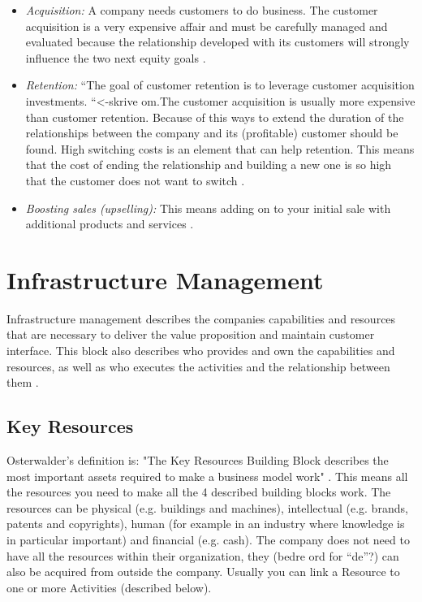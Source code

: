 \begin{itemize}
\renewcommand{\labelitemi}{$\bullet$}
\item \emph{Acquisition:} A company needs customers to do business. The customer acquisition is a very expensive affair and must be carefully managed and evaluated because the relationship developed with its customers will strongly influence the two next equity goals \cite{osterwalderthesis}.
\item \emph{Retention:} “The goal of customer retention is to leverage customer acquisition investments. “<-skrive om.The customer acquisition is usually more expensive than customer retention. Because of this ways to extend the duration of the relationships between the company and its (profitable) customer should be found. High switching costs is an element that can help retention. This means that the cost of ending the relationship and building a new one is so high that the customer does not want to switch \cite{osterwalderthesis}.
\item \emph{Boosting sales (upselling):} This means adding on to your initial sale with additional products and services \cite{osterwalderthesis}.
\end{itemize}

\section{Infrastructure Management}
Infrastructure management describes the companies capabilities and resources that are necessary to deliver the value proposition and maintain customer interface. This block also describes who provides and own the capabilities and resources, as well as who executes the activities and the relationship between them \cite{osterwalderthesis}.

\subsection{Key Resources}
Osterwalder's definition is: "The Key Resources Building Block describes the most important assets required to make a business model work" \cite{osterwalder}. This means all the resources you need to make all the 4 described building blocks work. The resources can be physical (e.g. buildings and machines), intellectual (e.g. brands, patents and copyrights), human (for example in an industry where knowledge is in particular important) and financial (e.g. cash). The company does not need to have all the resources within their organization, they (bedre ord for “de”?) can also be acquired from outside the company. Usually you can link a Resource to one or more Activities (described below).

